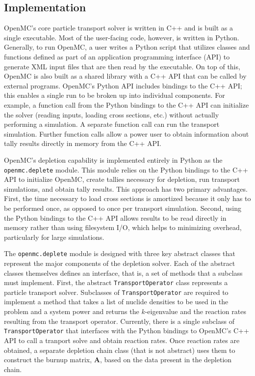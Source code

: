 \documentclass[3p,authoryear]{elsarticle}
\newcommand{\vect}[1]{\mathbf{#1}} %
\begin{document}
\subsection{Implementation}

OpenMC's core particle transport solver is written in C++ and is built as a
single executable. Most of the user-facing code, however, is written in Python.
Generally, to run OpenMC, a user writes a Python script that utilizes classes
and functions defined as part of an application programming interface (API) to
generate XML input files that are then read by the executable. On top of this,
OpenMC is also built as a shared library with a C++ API that can be called by
external programs. OpenMC's Python API includes bindings to the C++ API; this
enables a single run to be broken up into individual components. For example, a
function call from the Python bindings to the C++ API can initialize the solver
(reading inputs, loading cross sections, etc.) without actually performing a
simulation. A separate function call can run the transport simulation. Further
function calls allow a power user to obtain information about tally results
directly in memory from the C++ API.

OpenMC's depletion capability is implemented entirely in Python as the
\texttt{openmc.deplete} module. This module relies on the Python bindings to the
C++ API to initialize OpenMC, create tallies necessary for depletion, run
transport simulations, and obtain tally results. This approach has two primary
advantages. First, the time necessary to load cross sections is amortized
because it only has to be performed once, as opposed to once per transport
simulation. Second, using the Python bindings to the C++ API allows results to
be read directly in memory rather than using filesystem I/O, which helps to
minimizing overhead, particularly for large simulations.

The \texttt{openmc.deplete} module is designed with three key abstract classes
that represent the major components of the depletion solver. Each of the
abstract classes themselves defines an interface, that is, a set of methods that
a subclass must implement. First, the abstract \texttt{TransportOperator} class
represents a particle transport solver. Subclasses of \texttt{TransportOperator}
are required to implement a method that takes a list of nuclide densities to be
used in the problem and a system power and returns the $k$-eigenvalue and the
reaction rates resulting from the transport operator. Currently, there is a
single subclass of \texttt{TransportOperator} that interfaces with the Python
bindings to OpenMC's C++ API to call a tranport solve and obtain reaction rates.
Once reaction rates are obtained, a separate depletion chain class (that is not
abstract) uses them to construct the burnup matrix, $\vect{A}$, based on the
data present in the depletion chain.
\end{document}
